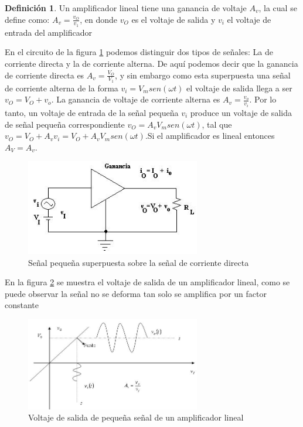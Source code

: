 \documentclass[12pt]{book}
\theoremstyle{definition}
\newtheorem{dfn}{Definición}[section]
\theoremstyle{remark}
\theoremstyle{plain}
\begin{document}
 
\begin{dfn}
\label{def1}
Un amplificador lineal tiene una ganancia de voltaje $A_v$, la cual se define como:
$
A_v=\frac{v_O}{v_1}
$,
en donde $v_O$ es el voltaje de salida y $v_i$ el voltaje de entrada del amplificador
\end{dfn}

En el circuito de la figura \ref{fig2} podemos distinguir dos tipos de señales: La de corriente directa y la de corriente alterna. De aquí podemos decir que la ganancia de corriente directa es $A_v=\frac{V_O}{V_1}$, y sin embargo como esta superpuesta una señal de corriente alterna de la forma $v_i=V_m sen(\omega t)$ el voltaje de salida llega a ser $v_O=V_O+v_o$. La ganancia de voltaje de corriente alterna es $A_v=\frac{v_o}{v_i}$. Por lo tanto, un voltaje de entrada de la señal pequeña $v_i$ produce un voltaje de salida de señal pequeña correspondiente $v_O=A_v V_m sen(\omega t)$, tal que $v_O=V_O+A_v v_i=V_O+A_v V_m sen (\omega t)$.Si el amplificador es lineal entonces $A_V=A_v$.

\begin{figure}
\centering
\includegraphics[width=3in]{Pequena.jpg}
\caption{Señal pequeña superpuesta sobre la señal de corriente directa}
\label{fig2}
\end{figure}

En la figura \ref{fig3}  se muestra el voltaje de salida de un amplificador lineal, como se puede observar la señal no se deforma tan solo se amplifica por un factor constante

\begin{figure}
\centering
\includegraphics[width=3in]{VoltajeSalida.jpg}
\caption{Voltaje de salida de pequeña señal de un amplificador lineal}
\label{fig3}
\end{figure}
\end{document}
